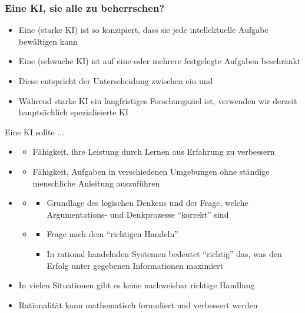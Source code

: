 \subsubsection*{Eine KI, sie alle zu beherrschen?}
\begin{itemize}
    \item Eine  (starke KI) ist so konzipiert, dass sie jede intellektuelle Aufgabe bewältigen kann
    \item Eine  (schwache KI) ist auf eine oder mehrere festgelegte Aufgaben beschränkt
    \item Diese entspricht der Unterscheidung zwischen ein  und 
    \item Während starke KI ein langfristiges Forschungsziel ist, verwenden wir derzeit hauptsächlich spezialisierte KI
\end{itemize}
Eine KI sollte ...
\begin{itemize}
    \item {}
    \begin{itemize}
        \item Fähigkeit, ihre Leistung durch Lernen aus Erfahrung zu verbessern
    \end{itemize}
    \item {}
    \begin{itemize}
        \item Fähigkeit, Aufgaben in verschiedenen Umgebungen ohne ständige menschliche Anleitung auszuführen
    \end{itemize}
    \item {}
    \begin{itemize}
        \item {}
        \begin{itemize}
            \item Grundlage des logischen Denkens und der Frage, welche Argumentations- und Denkprozesse \enquote{korrekt} sind
        \end{itemize}
        \item {}
        \begin{itemize}
            \item Frage nach dem \enquote{richtigen Handeln}
            \item In rational handelnden Systemen bedeutet \enquote{richtig} das, was den Erfolg unter gegebenen Informationen maximiert
        \end{itemize}
    \end{itemize}
\end{itemize}
\begin{itemize}
    \item {} In vielen Situationen gibt es keine nachweisbar richtige Handlung
    \item {} Rationalität kann mathematisch formuliert und verbessert werden
\end{itemize}
